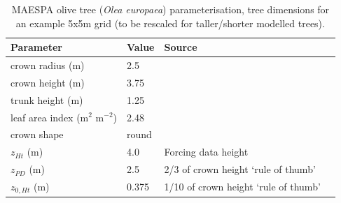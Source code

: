\documentclass[final,3p,times,authoryear]{elsarticle}
\begin{document}
\begin{center}
\begin{table}[!htbp]
\caption{MAESPA olive tree (\textit{Olea europaea}) parameterisation, tree dimensions for an example 5x5m grid (to be rescaled for taller/shorter modelled trees).\label{tab:olivescaled}}
\begin{tabular}{ |  l | l | l | l |}
\hline \textbf{Parameter} & \textbf{Value} & \textbf{Source} \\ 
\hline
crown radius (m) & 2.5 & \cite{Coutts2014a}\\ \hline
crown height (m) & 3.75 & \cite{Coutts2014a}\\ \hline
trunk height (m) & 1.25 & \cite{Coutts2014a}\\ \hline
leaf area index (m$^{2}$ m$^{-2}$)&2.48 &\cite{Mariscal2000}\\ \hline
crown shape & round &\\ \hline
$z_{Ht}$ (m)&4.0&Forcing data height \\ \hline
$z_{PD}$ (m) &2.5& 2/3 of crown height `rule of thumb' \citep{Grimmond1999}\\ \hline
$z_{0,Ht}$ (m) &0.375& 1/10 of crown height `rule of thumb' \citep{Grimmond1999} \\ \hline
\end{tabular} 
\end{table}
\end{center}
\end{document}
